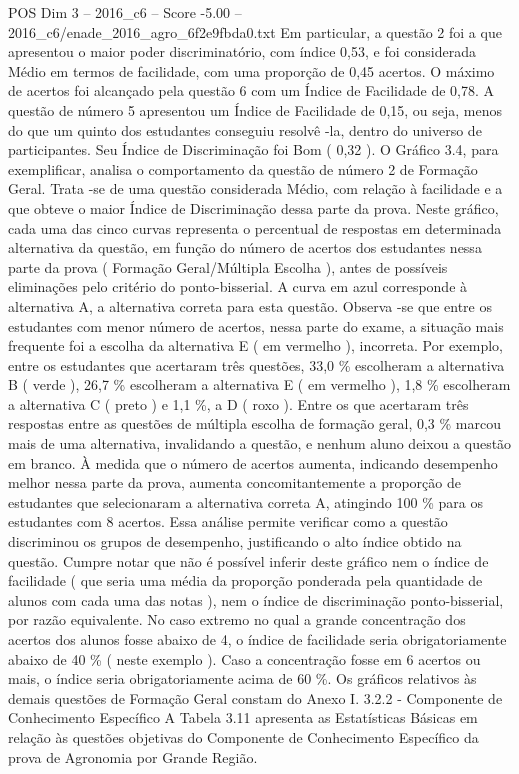 \begin{textsample}{POS Dim 3 – 2016\_c6 – Score -5.00 – 2016\_c6/enade\_2016\_agro\_6f2e9fbda0.txt}
Em particular, a questão 2 foi a que apresentou o maior poder discriminatório, com índice 0,53, e foi considerada Médio em termos de facilidade, com uma proporção de 0,45 acertos.
O máximo de acertos foi alcançado pela questão 6 com um Índice de Facilidade de 0,78.
A questão de número 5 apresentou um Índice de Facilidade de 0,15, ou seja, menos do que um quinto dos estudantes conseguiu resolvê -la, dentro do universo de participantes.
Seu Índice de Discriminação foi Bom ( 0,32 ).
O Gráfico 3.4, para exemplificar, analisa o comportamento da questão de número 2 de Formação Geral.
Trata -se de uma questão considerada Médio, com relação à facilidade e a que obteve o maior Índice de Discriminação dessa parte da prova.
Neste gráfico, cada uma das cinco curvas representa o percentual de respostas em determinada alternativa da questão, em função do número de acertos dos estudantes nessa parte da prova ( Formação Geral/Múltipla Escolha ), antes de possíveis eliminações pelo critério do ponto-bisserial.
A curva em azul corresponde à alternativa A, a alternativa correta para esta questão.
Observa -se que entre os estudantes com menor número de acertos, nessa parte do exame, a situação mais frequente foi a escolha da alternativa E ( em vermelho ), incorreta.
Por exemplo, entre os estudantes que acertaram três questões, 33,0 \% escolheram a alternativa B ( verde ), 26,7 \% escolheram a alternativa E ( em vermelho ), 1,8 \% escolheram a alternativa C ( preto ) e 1,1 \%, a D ( roxo ).
Entre os que acertaram três respostas entre as questões de múltipla escolha de formação geral, 0,3 \% marcou mais de uma alternativa, invalidando a questão, e nenhum aluno deixou a questão em branco.
À medida que o número de acertos aumenta, indicando desempenho melhor nessa parte da prova, aumenta concomitantemente a proporção de estudantes que selecionaram a alternativa correta A, atingindo 100 \% para os estudantes com 8 acertos.
Essa análise permite verificar como a questão discriminou os grupos de desempenho, justificando o alto índice obtido na questão.
Cumpre notar que não é possível inferir deste gráfico nem o índice de facilidade ( que seria uma média da proporção ponderada pela quantidade de alunos com cada uma das notas ), nem o índice de discriminação ponto-bisserial, por razão equivalente.
No caso extremo no qual a grande concentração dos acertos dos alunos fosse abaixo de 4, o índice de facilidade seria obrigatoriamente abaixo de 40 \% ( neste exemplo ).
Caso a concentração fosse em 6 acertos ou mais, o índice seria obrigatoriamente acima de 60 \%.
Os gráficos relativos às demais questões de Formação Geral constam do Anexo I. 3.2.2 - Componente de Conhecimento Específico A Tabela 3.11 apresenta as Estatísticas Básicas em relação às questões objetivas do Componente de Conhecimento Específico da prova de Agronomia por Grande Região.

\end{textsample}
